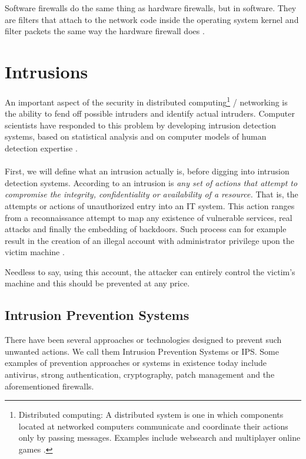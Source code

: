 Software firewalls do the same thing as hardware  firewalls, but in software. They are filters that attach to the network code inside the operating system kernel and filter packets the same way the hardware firewall does \citep{Tanenbaum}. 

\section{Intrusions}

An important aspect of the security in distributed computing\footnote{Distributed computing: A  distributed  system  is  one  in  which  components  located  at  networked  computers communicate  and  coordinate  their  actions  only  by  passing  messages. Examples include websearch and multiplayer online games \citep{Distributed}.} / networking is the ability to fend off possible intruders and identify actual intruders. Computer scientists have responded to this problem by developing intrusion detection systems, based on statistical analysis and on computer models of human detection expertise \citep{IDS}. \\ \\
First, we will define what an intrusion actually is, before digging into intrusion detection systems. According to \citep{tr} an intrusion is \emph{any set of actions that attempt to compromise the integrity, confidentiality or availability of a resource.} That is,  the attempts or actions of unauthorized entry into an IT system. This action ranges from a reconnaissance attempt to map any existence of vulnerable services, real attacks and finally the embedding of backdoors. Such process can for example result in the creation of an illegal account with administrator privilege upon the victim machine \citep{76}. 

Needless to say, using this account, the attacker can entirely control the victim's machine and this should be prevented at any price.

\subsection{Intrusion Prevention Systems}

There have been several approaches or technologies designed to prevent such unwanted actions. We call them Intrusion Prevention Systems or IPS. Some examples of prevention approaches or systems in existence today include antivirus, strong authentication, cryptography, patch management and the aforementioned firewalls.

